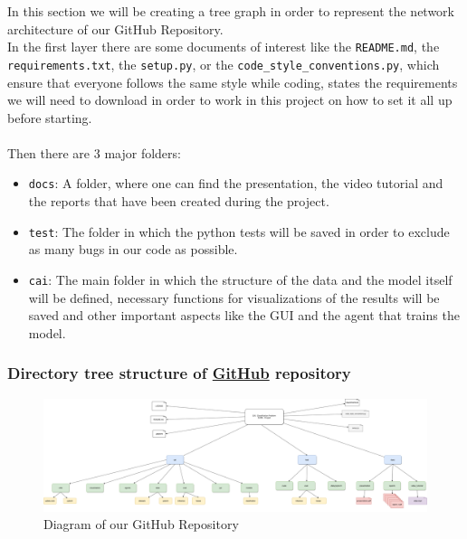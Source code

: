 \documentclass{article}
\begin{document}
In this section we will be creating a tree graph in order to represent the network architecture of our GitHub Repository.\\
\noindent
In the first layer there are some documents of interest like the \texttt{README.md}, the \texttt{requirements.txt}, the \texttt{setup.py}, or the \texttt{code\_style\_conventions.py}, which ensure that everyone follows the same style while coding, states the requirements we will need to download in order to work in this project on how to set it all up before starting.\\ \\
\noindent
Then there are 3 major folders:
\begin{itemize}
    \item \texttt{docs}: A folder, where one can find the presentation, the video tutorial and the reports that have been created during the project.
    \item \texttt{test}: The folder in which the python tests will be saved in order to exclude as many bugs in our code as possible.
    \item \texttt{cai}: The main folder in which the structure of the data and the model itself will be defined, necessary functions for visualizations of the results will be saved and other important aspects like the GUI and the agent that trains the model.
\end{itemize}

\subsubsection{Directory tree structure of \href{https://github.com/amrane99/CAI-Classification/tree/main}{GitHub} repository}

\begin{figure}[H]
    \centering
    \includegraphics[width=\textwidth]{CAI diagram.png}
    \caption{Diagram of our GitHub Repository}
    \label{fig:diagram}
\end{figure}
\printbibliography
\end{document}
